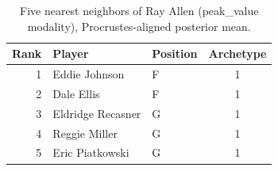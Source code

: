 \begin{table}[htbp]
  \centering\small
  \begin{tabular}{rllc}
    \toprule
    Rank & Player & Position & Archetype \\
    \midrule
    1 & Eddie Johnson & F & 1 \\
    2 & Dale Ellis & F & 1 \\
    3 & Eldridge Recasner & G & 1 \\
    4 & Reggie Miller & G & 1 \\
    5 & Eric Piatkowski & G & 1 \\
    \bottomrule
  \end{tabular}
  \caption{Five nearest neighbors of Ray Allen (peak_value modality), Procrustes-aligned posterior mean.}
  \label{tab:Ray_Allen_neighbors_peak_value}
\end{table}

